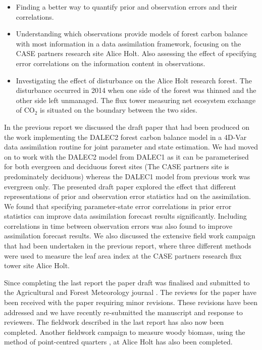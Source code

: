 \documentclass[11pt]{article}
\begin{document}
\begin{itemize}
\item Finding a better way to quantify prior and observation errors and their correlations.
\item Understanding which observations provide models of forest carbon balance with most information in a data assimilation framework, focusing on the CASE partners research site Alice Holt. Also assessing the effect of specifying error correlations on the information content in observations.
\item Investigating the effect of disturbance on the Alice Holt research forest. The disturbance occurred in 2014 when one side of the forest was thinned and the other side left unmanaged. The flux tower measuring net ecosystem exchange of $\text{CO}_{2}$ is situated on the boundary between the two sides. 
\end{itemize}

In the previous report we discussed the draft paper that had been produced on the work implementing the DALEC2 forest carbon balance model \citep{Bloom2015} in a 4D-Var data assimilation routine for joint parameter and state estimation. We had moved on to work with the DALEC2 model from DALEC1 as it can be parameterised for both evergreen and deciduous forest sites (The CASE partners site is predominately deciduous) whereas the DALEC1 model from previous work was evergreen only. The presented draft paper explored the effect that different representations of prior and observation error statistics had on the assimilation. We found that specifying parameter-state error correlations in prior error statistics can improve data assimilation forecast results significantly. Including correlations in time between observation errors was also found to improve assimilation forecast results. We also discussed the extensive field work campaign that had been undertaken in the previous report, where three different methods were used to measure the leaf area index at the CASE partners research flux tower site Alice Holt.    

Since completing the last report the paper draft was finalised and submitted to the Agricultural and Forest Meteorology journal \citep{Pinnington2016}. The reviews for the paper have been received with the paper requiring minor revisions. These revisions have been addressed and we have recently re-submitted the manuscript and response to reviewers. The fieldwork described in the last report has also now been completed. Another fieldwork campaign to measure woody biomass, using the method of point-centred quarters \citep{dahdouh2006empirical}, at Alice Holt has also been completed.    
\end{document}
